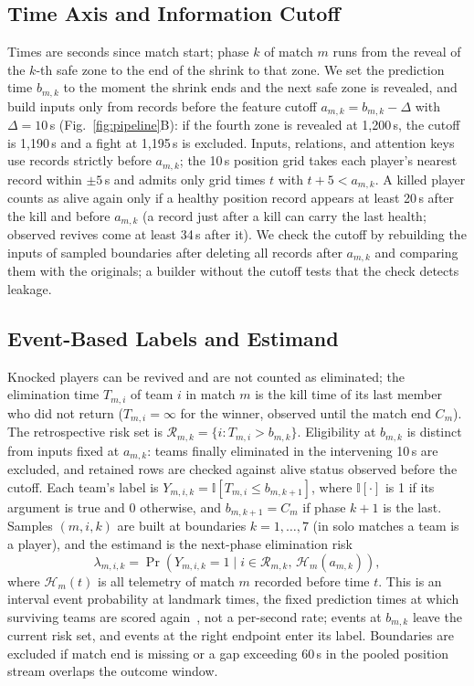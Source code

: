 \documentclass[sigconf,anonymous,nonacm]{acmart}
\begin{document}
\subsection{Time Axis and Information Cutoff}
\label{sec:method:samples}
Times are seconds since match start; phase $k$ of match $m$ runs from the reveal of the $k$-th safe zone to the end of the shrink to that zone.
We set the prediction time $b_{m,k}$ to the moment the shrink ends and the next safe zone is revealed, and build inputs only from records before the feature cutoff $a_{m,k}=b_{m,k}-\Delta$ with $\Delta=10$\,s (Fig.~\ref{fig:pipeline}B): if the fourth zone is revealed at 1,200\,s, the cutoff is 1,190\,s and a fight at 1,195\,s is excluded. Inputs, relations, and attention keys use records strictly before $a_{m,k}$; the 10\,s position grid takes each player's nearest record within $\pm5$\,s and admits only grid times $t$ with $t+5<a_{m,k}$.
A killed player counts as alive again only if a healthy position record appears at least 20\,s after the kill and before $a_{m,k}$ (a record just after a kill can carry the last health; observed revives come at least 34\,s after it).
We check the cutoff by rebuilding the inputs of sampled boundaries after deleting all records after $a_{m,k}$ and comparing them with the originals; a builder without the cutoff tests that the check detects leakage.

\subsection{Event-Based Labels and Estimand}
\label{sec:method:labels}
Knocked players can be revived and are not counted as eliminated; the elimination time $T_{m,i}$ of team $i$ in match $m$ is the kill time of its last member who did not return ($T_{m,i}=\infty$ for the winner, observed until the match end $C_m$).
The retrospective risk set is $\mathcal{R}_{m,k}=\{i:T_{m,i}>b_{m,k}\}$. Eligibility at $b_{m,k}$ is distinct from inputs fixed at $a_{m,k}$: teams finally eliminated in the intervening 10\,s are excluded, and retained rows are checked against alive status observed before the cutoff.
Each team's label is $Y_{m,i,k}=\mathbb{I}[T_{m,i}\le b_{m,k+1}]$, where $\mathbb{I}[\cdot]$ is 1 if its argument is true and 0 otherwise, and $b_{m,k+1}=C_m$ if phase $k+1$ is the last.
Samples $(m,i,k)$ are built at boundaries $k=1,\dots,7$ (in solo matches a team is a player), and the estimand is the next-phase elimination risk
\begin{equation}
\lambda_{m,i,k}=\Pr\!\left(Y_{m,i,k}=1 \mid i\in\mathcal{R}_{m,k},\,\mathcal{H}_{m}(a_{m,k})\right),
\label{eq:hazard}
\end{equation}
where $\mathcal{H}_{m}(t)$ is all telemetry of match $m$ recorded before time $t$.
This is an interval event probability at landmark times, the fixed prediction times at which surviving teams are scored again~\cite{vanHouwelingen07}, not a per-second rate; events at $b_{m,k}$ leave the current risk set, and events at the right endpoint enter its label. Boundaries are excluded if match end is missing or a gap exceeding 60\,s in the pooled position stream overlaps the outcome window.
\end{document}
